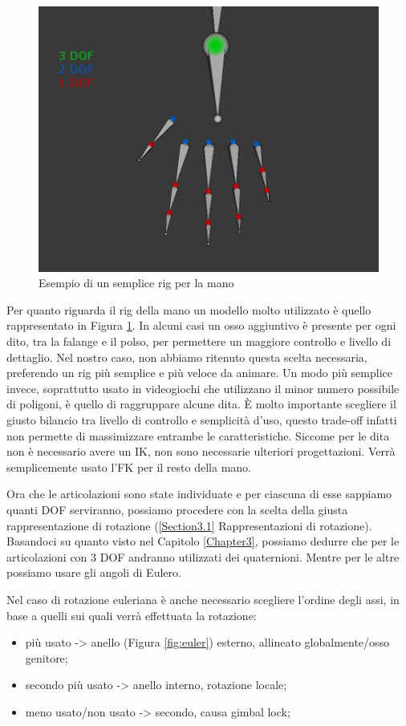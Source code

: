 \begin{figure}
\centering
\includegraphics[width=.8\textwidth]{Figures/hand}
\decoRule
\caption[Rig mano]{Esempio di un semplice rig per la mano}
\label{fig:hand}
\end{figure}

\newpage
Per quanto riguarda il rig della mano un modello molto utilizzato è quello rappresentato in Figura \ref{fig:hand}.
In alcuni casi un osso aggiuntivo è presente per ogni dito, tra la falange e il polso, per permettere un maggiore controllo e livello di dettaglio.
Nel nostro caso, non abbiamo ritenuto questa scelta necessaria, preferendo un rig più semplice e più veloce da animare. 
Un modo più semplice invece, soprattutto usato in videogiochi che utilizzano il minor numero possibile di poligoni, è quello di raggruppare alcune dita.
È molto importante scegliere il giusto bilancio tra livello di controllo e semplicità d'uso, questo trade-off infatti non permette di massimizzare entrambe le caratteristiche.
Siccome per le dita non è necessario avere un IK, non sono necessarie ulteriori progettazioni. Verrà semplicemente usato l'FK per il resto della mano.

Ora che le articolazioni sono state individuate e per ciascuna di esse sappiamo quanti DOF serviranno, possiamo procedere con la scelta della giusta rappresentazione di rotazione (\ref{Section3.1} Rappresentazioni di rotazione).
Basandoci su quanto visto nel Capitolo \ref{Chapter3}, possiamo dedurre che per le articolazioni con 3 DOF andranno utilizzati dei quaternioni. Mentre per le altre possiamo usare gli angoli di Eulero.

Nel caso di rotazione euleriana è anche necessario scegliere l'ordine degli assi, in base a quelli sui quali verrà effettuata la rotazione:
\begin{itemize}
    \item più usato -> anello (Figura \ref{fig:euler}) esterno, allineato globalmente/osso genitore;
    \item secondo più usato -> anello interno, rotazione locale;
    \item meno usato/non usato -> secondo, causa gimbal lock;
\end{itemize}

